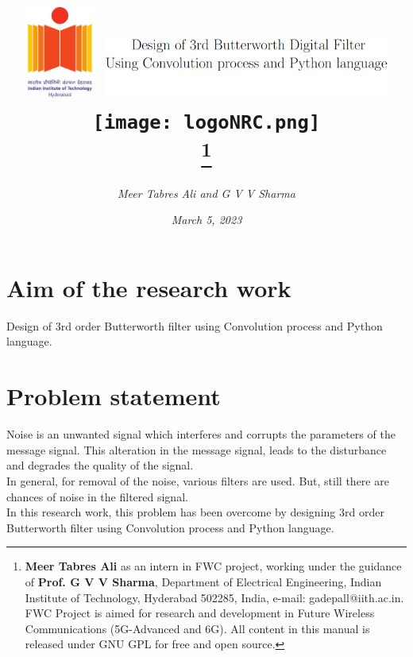 \documentclass[journal,10pt,twocolumn]{article}
\begin{document}

\let\vec\mathbf


\title{{\includegraphics[width=2.4cm]{logoIITH.png}}
\hspace{1.0cm}
{\includegraphics[width=9.5cm]{title.png}}
\hspace{1.0cm}
{\texttt{[image: logoNRC.png]}}\\
\thanks{\textbf{Meer Tabres Ali} as an intern in FWC project, working under the guidance of \textbf{Prof. G V V Sharma}, Department of Electrical Engineering, Indian Institute of Technology, Hyderabad 502285, India, e-mail: gadepall@iith.ac.in. FWC Project is aimed for research and development in Future Wireless Communications (5G-Advanced and 6G). All content in this manual is released under GNU GPL for free and open source.}}

\author{\textit{Meer Tabres Ali and G V V Sharma}} 
\date{\textit{March 5, 2023}}

\maketitle
\tableofcontents
\section{Aim of the research work}
Design of 3rd order Butterworth filter using Convolution process and Python language.

\section{Problem statement}
\vspace{0.1cm}
\begin{flushleft}
Noise is an unwanted signal which interferes and corrupts the parameters of the message signal. This alteration in the message signal, leads to the disturbance and degrades the quality of the signal. \\
\vspace{0.2cm}
In general, for removal of the noise, various filters are used. But, still there are chances of noise in the filtered signal.\\
\vspace{0.2cm}
In this research work, this problem has been overcome by designing 3rd order Butterworth filter using Convolution process and Python language.\\
\end{flushleft}
\end{document}
